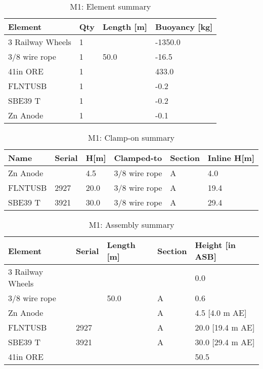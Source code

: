 \documentclass{article}
\begin{document}
\begin{table}[!htbp]
\centering
\caption{M1: Element summary}
\begin{tabular}{llll}
\toprule
Element & Qty & Length [m] & Buoyancy [kg] \\
\midrule
3 Railway Wheels & 1 &  & -1350.0 \\
3/8 wire rope & 1 & 50.0 & -16.5 \\
41in ORE & 1 &  & 433.0 \\
FLNTUSB & 1 &  & -0.2 \\
SBE39 T & 1 &  & -0.2 \\
Zn Anode & 1 &  & -0.1 \\
\bottomrule
\end{tabular}
\end{table}

\begin{table}[!htbp]
\centering
\caption{M1: Clamp-on summary}
\begin{tabular}{llllll}
\toprule
Name & Serial & H[m] & Clamped-to & Section & Inline H[m] \\
\midrule
Zn Anode &  & 4.5 & 3/8 wire rope & A & 4.0 \\
FLNTUSB & 2927 & 20.0 & 3/8 wire rope & A & 19.4 \\
SBE39 T & 3921 & 30.0 & 3/8 wire rope & A & 29.4 \\
\bottomrule
\end{tabular}
\end{table}

\begin{table}[!htbp]
\centering
\caption{M1: Assembly summary}
\begin{tabular}{lllll}
\toprule
Element & Serial & Length [m] & Section & Height [in ASB] \\
\midrule
3 Railway Wheels &  &  &  & 0.0 \\
3/8 wire rope &  & 50.0 & A & 0.6 \\
Zn Anode &  &  & A & 4.5 [4.0 m AE] \\
FLNTUSB & 2927 &  & A & 20.0 [19.4 m AE] \\
SBE39 T & 3921 &  & A & 30.0 [29.4 m AE] \\
41in ORE &  &  &  & 50.5 \\
\bottomrule
\end{tabular}
\end{table}
\end{document}
